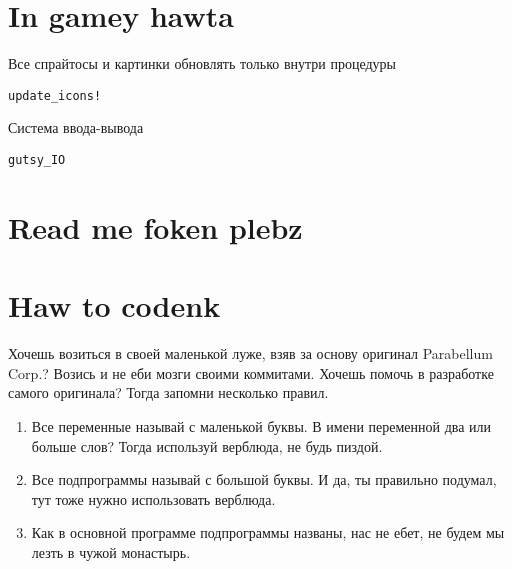 \documentclass[a4paper,12pt]{article}
\begin{document}
\section{In gamey hawta}
Все спрайтосы и картинки обновлять только внутри процедуры \begin{verbatim}update_icons!\end{verbatim}
Система ввода-вывода \begin{verbatim}gutsy_IO\end{verbatim}
\section{Read me foken plebz}
\section{Haw to codenk}
Хочешь возиться в своей маленькой луже, взяв за основу оригинал Parabellum Corp.? Возись и не еби мозги своими коммитами. Хочешь помочь в разработке самого оригинала? Тогда запомни несколько правил.
\begin{enumerate}
  \item Все переменные называй с маленькой буквы. В имени переменной два или больше слов? Тогда используй верблюда, не будь пиздой.
  \item Все подпрограммы называй с большой буквы. И да, ты правильно подумал, тут тоже нужно использовать верблюда.
  \item Как в основной программе подпрограммы названы, нас не ебет, не будем мы лезть в чужой монастырь.
\end{enumerate}
\end{document}

